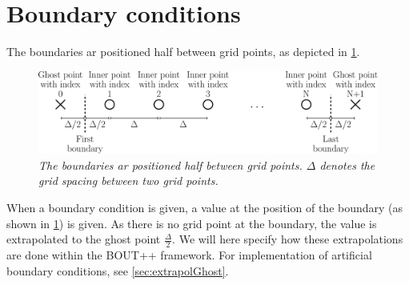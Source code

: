 \section{Boundary conditions}
%
The boundaries ar positioned half between grid points, as depicted in \cref{fig:flatBC}.
%
\begin{figure}[htb]
    \centering
    \includegraphics[width=1.0\textwidth]{fig/flatGrid}
    \caption{\textit{
            The boundaries ar positioned half between grid points.
            $\Delta$ denotes the grid spacing between two grid points.
        }}
    \label{fig:flatBC}
\end{figure}
%
When a boundary condition is given, a value at the position of the boundary (as shown in \cref{fig:flatBC}) is given.
As there is no grid point at the boundary, the value is extrapolated to the ghost point $\frac{\Delta}{2}$.
We will here specify how these extrapolations are done within the BOUT++ framework.
For implementation of artificial boundary conditions, see \cref{sec:extrapolGhost}.

